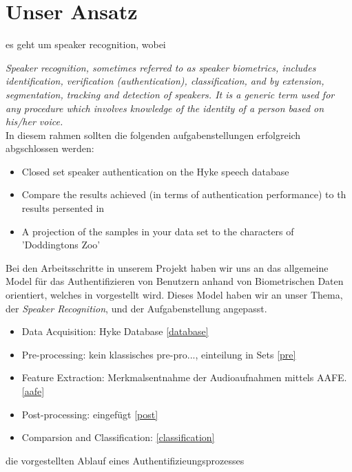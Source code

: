 \section{Unser Ansatz}
\label{approach}

es geht um speaker recognition, wobei


\textit{Speaker recognition, sometimes referred to as speaker biometrics, includes identification, verification (authentication), classification, and by extension, segmentation,
tracking and detection of speakers. It is a generic term used for any procedure which
involves knowledge of the identity of a person based on his/her voice.}
\cite{beigi} \\


In diesem rahmen sollten die folgenden aufgabenstellungen erfolgreich abgschlossen werden:
\begin{itemize}
	\item[\textbullet] Closed set speaker authentication on the Hyke speech database
	\item[\textbullet] Compare the results achieved (in terms of authentication performance) to th results persented in \cite{hyke}
	\item[\textbullet]  A projection of the samples in your data set to the characters of 'Doddingtons Zoo' 
\end{itemize}
 

Bei den Arbeitsschritte in unserem Projekt haben wir uns an das allgemeine Model für das Authentifizieren von Benutzern anhand von Biometrischen Daten orientiert, welches in \cite{vioelhauer} vorgestellt wird. Dieses Model haben wir an unser Thema, der \textit{Speaker Recognition}, und der Aufgabenstellung angepasst.

\begin{itemize}
	\item[\textbullet] Data Acquisition: Hyke Database \ref{database}
	\item[\textbullet] Pre-processing: kein klassisches pre-pro..., einteilung in Sets \ref{pre}
	\item[\textbullet] Feature Extraction: Merkmalsentnahme der Audioaufnahmen mittels AAFE. \ref{aafe}
	\item[\textbullet] Post-processing: eingefügt \ref{post}
	\item[\textbullet] Comparsion and Classification: \ref{classification}
\end{itemize}


die vorgestellten Ablauf eines Authentifizieungsprozesses 

